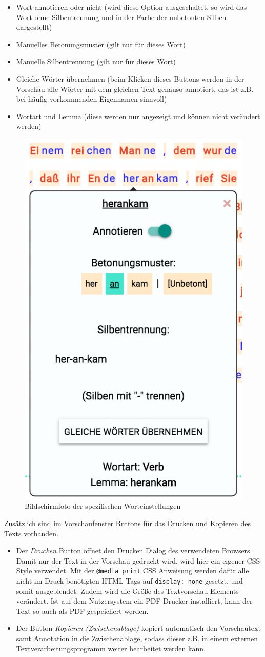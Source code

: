 \begin{itemize}
	\item Wort annotieren oder nicht (wird diese Option ausgeschaltet, so wird das Wort ohne Silbentrennung und in der Farbe der unbetonten Silben dargestellt)
	\item Manuelles Betonungsmuster (gilt nur für dieses Wort)
	\item Manuelle Silbentrennung (gilt nur für dieses Wort)
	\item Gleiche Wörter übernehmen (beim Klicken dieses Buttons werden in der Vorschau alle Wörter mit dem gleichen Text genauso annotiert, das ist z.B. bei häufig vorkommenden Eigennamen sinnvoll)
	\item Wortart und Lemma (diese werden nur angezeigt und können nicht verändert werden)
\end{itemize}

\begin{figure}[h!]
	\centering
	\includegraphics[width=.4\linewidth, frame]{figures/frontend/wordpopup}
	\caption{Bildschirmfoto der spezifischen Worteinstellungen}
	\label{fig:frontend-wordconf}
\end{figure}

Zusätzlich sind im Vorschaufenster Buttons für das Drucken und Kopieren des Texts vorhanden.
\begin{itemize}
	\item Der \textit{Drucken} Button öffnet den Drucken Dialog des verwendeten Browsers. Damit nur der Text in der Vorschau gedruckt wird, wird hier ein eigener CSS Style verwendet. Mit der \texttt{@media print} CSS Anweisung werden dafür alle nicht im Druck benötigten HTML Tags auf \texttt{display: none} gesetzt. und somit ausgeblendet. Zudem wird die Größe des Textvorschau Elements verändert. Ist auf dem Nutzersystem ein PDF Drucker installiert, kann der Text so auch als PDF gespeichert werden.
	
	\item Der Button \textit{Kopieren (Zwischenablage)} kopiert automatisch den Vorschautext samt Annotation in die Zwischenablage, sodass dieser z.B. in einem externen Textverarbeitungsprogramm weiter bearbeitet werden kann.
\end{itemize}


